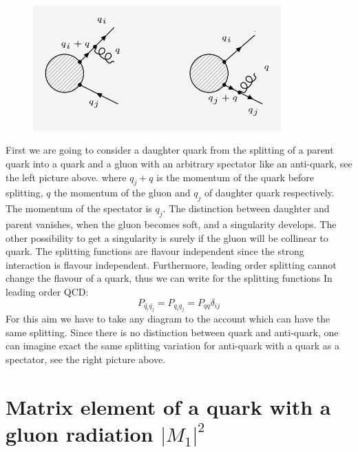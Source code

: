\begin{figure}[ht!]
\centering
\includegraphics[width=0.85\textwidth]{images/QQ/qqg-diagrams.png}
\end{figure}
First we are going to consider a daughter quark from the splitting of a parent quark into a
quark and a gluon with an arbitrary spectator like an anti-quark, see the left picture above. where $ q_j+q $ is the momentum of the quark before splitting, $q$ the momentum of the gluon and $q_j$ of daughter quark respectively. The momentum of the spectator is $ q_j $. The distinction between daughter and parent vanishes, when the gluon becomes soft,  and a
singularity develops. The other possibility to get a singularity is surely if the gluon will be collinear to quark. The splitting functions are flavour independent since the strong interaction is flavour independent. Furthermore,
leading order splitting cannot change the flavour of a quark, thus we can write for the splitting functions In leading order QCD:
\begin{equation}
P_{{\bar{q_i}}{\bar{q_j}}}=P_{{q_i}{q_j}}=P_{{q}{q}} \delta_{ij}
\end{equation}
For this aim we have to take any diagram to the account which can have the same splitting. Since there is no distinction between quark and anti-quark, one can imagine exact the same splitting variation for anti-quark with a quark as a spectator, see the right picture above.


\pagebreak
\section{Matrix element of a quark with a gluon radiation $ |M_1|^2 $}

